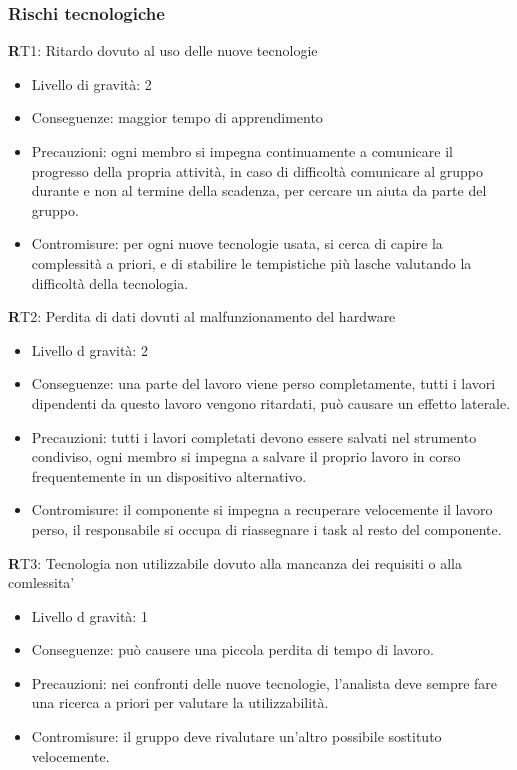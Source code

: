 \subsubsection{Rischi tecnologiche}
\textbf RT1:
 Ritardo dovuto al uso delle nuove tecnologie
\begin{itemize}
\item Livello di gravità: 2
\item Conseguenze: maggior tempo di apprendimento
\item Precauzioni: ogni membro si impegna continuamente a comunicare il progresso della propria attività, in caso di difficoltà comunicare al gruppo durante e non al termine della scadenza, per cercare un aiuta da parte del gruppo.
\item Contromisure: per ogni nuove tecnologie usata, si cerca di capire la complessità a priori, e di stabilire le tempistiche più lasche valutando la difficoltà della tecnologia.
\end{itemize}

\textbf RT2: 
Perdita di dati dovuti al malfunzionamento del hardware
\begin{itemize}
\item Livello d gravità: 2
\item Conseguenze: una parte del lavoro viene perso completamente, tutti i lavori dipendenti da questo lavoro vengono ritardati, può causare un effetto laterale.
\item Precauzioni: tutti i lavori completati devono essere salvati nel strumento condiviso, ogni membro si impegna a salvare il proprio lavoro in corso frequentemente in un dispositivo alternativo.
\item Contromisure: il componente si impegna a recuperare velocemente il lavoro perso, il responsabile si occupa di riassegnare i task al resto del componente.
\end{itemize}

\textbf RT3: 
Tecnologia non utilizzabile dovuto alla mancanza dei requisiti o alla comlessita'
\begin{itemize}
\item Livello d gravità: 1
\item Conseguenze: può causere una piccola perdita di tempo di lavoro.
\item Precauzioni: nei confronti delle nuove tecnologie, l'analista deve sempre fare una ricerca a priori per valutare la utilizzabilità.
\item Contromisure: il gruppo deve rivalutare un'altro possibile sostituto velocemente.
\end{itemize}

